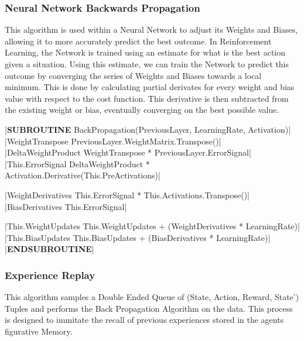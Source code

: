 \begin{flushleft}
                \vspace{0.2cm}
                \begin{pseudocode}

                \end{pseudocode}

                \vspace{0.5cm}
            \subsubsection{Neural Network Backwards Propagation}
                This algorithm is used within a Neural Network to adjust its Weights and Biases, allowing it to more accurately predict the
                best outcome. In Reinforcement Learning, the Network is trained using an estimate for what is the best action given a situation.
                Using this estimate, we can train the Network to predict this outcome by converging the series of Weights and Biases towards a
                local minimum. This is done by calculating partial derivates for every weight and bias value with respect to the cost function.
                This derivative is then subtracted from the existing weight or bias, eventually converging on the best possible value.

                \vspace{0.2cm}
                \begin{pseudocode}
|\textbf{SUBROUTINE} BackPropagation(PreviousLayer, LearningRate, Activation)|
    |WeightTranspose \leftarrow PreviousLayer.WeightMatrix.Transpose()|
    |DeltaWeightProduct \leftarrow WeightTranspose * PreviousLayer.ErrorSignal|
    |This.ErrorSignal \leftarrow DeltaWeightProduct * Activation.Derivative(This.PreActivations)|

    |WeightDerivatives \leftarrow This.ErrorSignal * This.Activations.Transpose()|
    |BiasDerivatives \leftarrow This.ErrorSignal|

    |This.WeightUpdates \leftarrow This.WeightUpdates + (WeightDerivatives * LearningRate)|
    |This.BiasUpdates \leftarrow This.BiasUpdates + (BiasDerivatives * LearningRate)|
|\textbf{ENDSUBROUTINE}|
                \end{pseudocode}

                \vspace{0.5cm}
            \subsubsection{Experience Replay}
                This algorithm samples a Double Ended Queue of (State, Action, Reward, State') Tuples and performs the Back Propagation Algorithm
                on the data. This process is designed to immitate the recall of previous experiences stored in the agents figurative Memory.


\end{flushleft}
